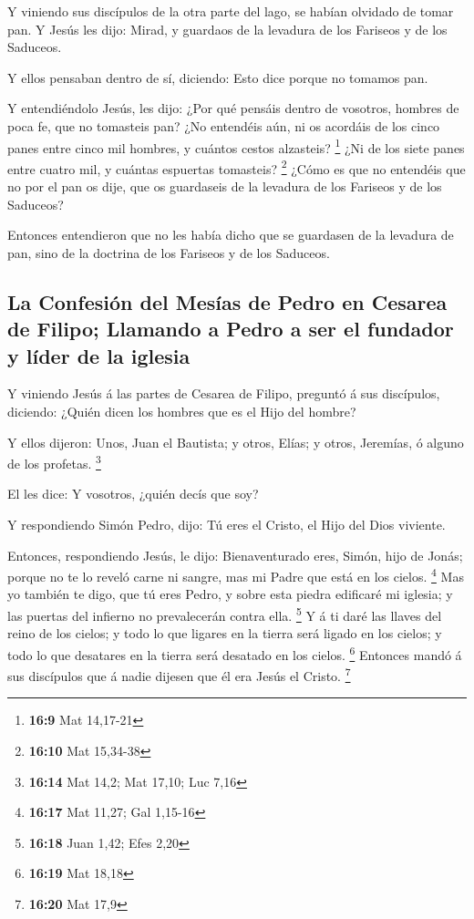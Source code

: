  Y viniendo sus discípulos de la otra parte del lago, se
habían olvidado de tomar pan.  Y Jesús les dijo: Mirad, y
guardaos de la levadura de los Fariseos y de los Saduceos.

 Y ellos pensaban dentro de sí, diciendo: Esto dice porque
no tomamos pan.

 Y entendiéndolo Jesús, les dijo: ¿Por qué pensáis dentro
de vosotros, hombres de poca fe, que no tomasteis pan? 
¿No entendéis aún, ni os acordáis de los cinco panes entre cinco mil
hombres, y cuántos cestos alzasteis? \footnote{\textbf{16:9} Mat
  14,17-21}  ¿Ni de los siete panes entre cuatro mil, y
cuántas espuertas tomasteis? \footnote{\textbf{16:10} Mat 15,34-38}
 ¿Cómo es que no entendéis que no por el pan os dije, que
os guardaseis de la levadura de los Fariseos y de los Saduceos?

 Entonces entendieron que no les había dicho que se
guardasen de la levadura de pan, sino de la doctrina de los Fariseos y
de los Saduceos.

\hypertarget{la-confesiuxf3n-del-mesuxedas-de-pedro-en-cesarea-de-filipo-llamando-a-pedro-a-ser-el-fundador-y-luxedder-de-la-iglesia}{%
\subsection{La Confesión del Mesías de Pedro en Cesarea de Filipo;
Llamando a Pedro a ser el fundador y líder de la
iglesia}\label{la-confesiuxf3n-del-mesuxedas-de-pedro-en-cesarea-de-filipo-llamando-a-pedro-a-ser-el-fundador-y-luxedder-de-la-iglesia}}

 Y viniendo Jesús á las partes de Cesarea de Filipo,
preguntó á sus discípulos, diciendo: ¿Quién dicen los hombres que es el
Hijo del hombre?

 Y ellos dijeron: Unos, Juan el Bautista; y otros, Elías;
y otros, Jeremías, ó alguno de los profetas. \footnote{\textbf{16:14}
  Mat 14,2; Mat 17,10; Luc 7,16}

 El les dice: Y vosotros, ¿quién decís que soy?

 Y respondiendo Simón Pedro, dijo: Tú eres el Cristo, el
Hijo del Dios viviente.

 Entonces, respondiendo Jesús, le dijo: Bienaventurado
eres, Simón, hijo de Jonás; porque no te lo reveló carne ni sangre, mas
mi Padre que está en los cielos. \footnote{\textbf{16:17} Mat 11,27; Gal
  1,15-16}  Mas yo también te digo, que tú eres Pedro, y
sobre esta piedra edificaré mi iglesia; y las puertas del infierno no
prevalecerán contra ella. \footnote{\textbf{16:18} Juan 1,42; Efes 2,20}
 Y á ti daré las llaves del reino de los cielos; y todo
lo que ligares en la tierra será ligado en los cielos; y todo lo que
desatares en la tierra será desatado en los cielos. \footnote{\textbf{16:19}
  Mat 18,18}  Entonces mandó á sus discípulos que á nadie
dijesen que él era Jesús el Cristo. \footnote{\textbf{16:20} Mat 17,9}

